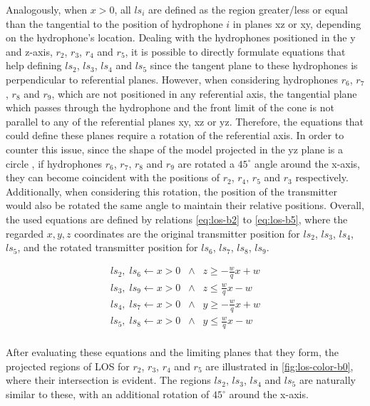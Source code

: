 Analogously, when $x > 0$, all $ls_i$ are defined as the region greater/less or equal than the tangential to the position of hydrophone $i$ in planes xz or xy, depending on the hydrophone's location. Dealing with the hydrophones positioned in the y and z-axis, $r_2$, $r_3$, $r_4$ and $r_5$, it is possible to directly formulate equations that help defining $ls_2$, $ls_3$, $ls_4$ and $ls_5$ since the tangent plane to these hydrophones is perpendicular to referential planes. However, when considering hydrophones $r_6$, $r_7$, $r_8$ and $r_9$, which are not positioned in any referential axis, the tangential plane which passes through the hydrophone and the front limit of the cone is not parallel to any of the referential planes xy, xz or yz. Therefore, the equations that could define these planes require a rotation of the referential axis. In order to counter this issue, since the shape of the model projected in the yz plane is a circle , if hydrophones $r_6$, $r_7$, $r_8$ and $r_9$ are rotated a $45^{\circ}$ angle around the x-axis, they can become coincident with the positions of $r_2$, $r_4$, $r_5$ and $r_3$ respectively. Additionally, when considering this rotation, the position of the transmitter would also be rotated the same angle to maintain their relative positions. Overall, the used equations are defined by relations \ref{eq:los-b2} to \ref{eq:los-b5}, where the regarded $x,y,z$ coordinates are the original transmitter position for $ls_2$, $ls_3$, $ls_4$, $ls_5$, and the rotated transmitter position for $ls_6$, $ls_7$, $ls_8$, $ls_9$.

\begin{eqnarray}
ls_2, \;  ls_6  \gets x > 0 \; \;  \wedge  \; \; z \geq -\frac{w}{q} x + w  \\
\label{eq:los-b2}
ls_3, \;  ls_9 \gets x > 0 \; \;  \wedge  \; \; z \leq \frac{w}{q} x - w  \\
\label{eq:los-b3}
ls_4, \;  ls_7 \gets x > 0 \; \;  \wedge  \; \; y \geq -\frac{w}{q} x + w   \\
\label{eq:los-b4}
ls_5, \;  ls_8 \gets x > 0 \; \;  \wedge  \; \; y \leq \frac{w}{q} x - w  \\
\label{eq:los-b5}
\end{eqnarray}

After evaluating these equations and the limiting planes that they form, the projected regions of LOS for $r_2$, $r_3$, $r_4$ and $r_5$ are illustrated in \ref{fig:los-color-b0}, where their intersection is evident. The regions $ls_2$, $ls_3$, $ls_4$ and $ls_5$ are naturally similar to these, with an additional rotation of $45^{\circ}$ around the x-axis.

